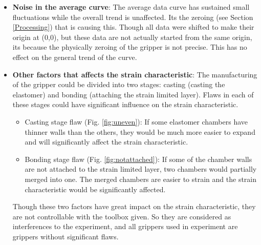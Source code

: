 \documentclass[conference]{IEEEtran}
\begin{document}
\begin{itemize}
    \item  \textbf{Noise in the average curve}: The average data curve has sustained small fluctuations while the overall trend is unaffected. Its the zeroing (see Section \ref{Processing}) that is causing this. Though all data were shifted to make their origin at (0,0), but these data are not actually started from the same origin, its because the physically zeroing of the gripper is not precise. This has no effect on the general trend of the curve.
    \item \textbf{Other factors that affects the strain characteristic}: The manufacturing of the gripper could be divided into two stages: casting (casting the elastomer) and bonding (attaching the strain limited layer). Flaws in each of these stages could have significant influence on the strain characteristic.
        \begin{itemize}
            \item Casting stage flaw (Fig. \ref{fig:uneven}): If some elastomer chambers have thinner walls than the others, they would be much more easier to expand and will significantly affect the strain characteristic.
            \item Bonding stage flaw (Fig. \ref{fig:notattached}): If some of the chamber walls are not attached to the strain limited layer, two chambers would partially merged into one. The merged chambers are easier to strain and the strain characteristic would be significantly affected.
        \end{itemize}
        Though these two factors have great impact on the strain characteristic, they are not controllable with the toolbox given. So they are considered as interferences to the experiment, and all grippers used in experiment are grippers without significant flaws.
\end{itemize}
\end{document}
